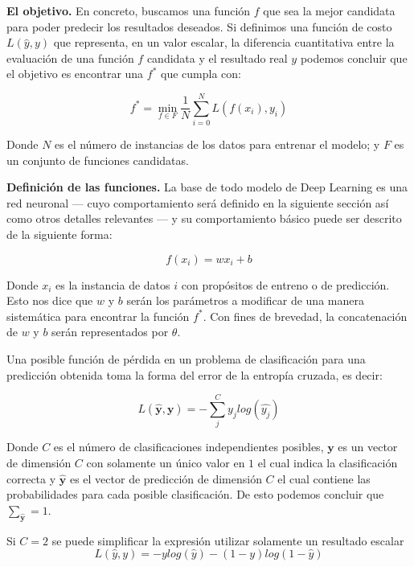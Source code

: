 \textbf{El objetivo.} En concreto, buscamos una función $f$ que sea la mejor candidata para poder predecir los resultados deseados. Si definimos una función de costo $L(\hat{y}, y)$ que representa, en un valor escalar, la diferencia cuantitativa entre la evaluación de una función $f$ candidata y el resultado real $y$ podemos concluir que el objetivo es encontrar una $f^*$ que cumpla con:

\[ f^* = \min_{f \in F} \frac{1}{N} \sum_{i = 0}^{N} L(f(x_i), y_i) \]

Donde $N$ es el número de instancias de los datos para entrenar el modelo; y $F$ es un conjunto de funciones candidatas.

\textbf{Definición de las funciones.} La base de todo modelo de Deep Learning es una red neuronal --- cuyo comportamiento será definido en la siguiente sección así como otros detalles relevantes --- y su comportamiento básico puede ser descrito de la siguiente forma:

\[ f(x_i) = w x_i + b \]

Donde $x_i$ es la instancia de datos $i$ con propósitos de entreno o de predicción. Esto nos dice que $w$ y $b$ serán los parámetros a modificar de una manera sistemática para encontrar la función $f^*$. Con fines de brevedad, la concatenación de $w$ y $b$ serán representados por $\theta$.

Una posible función de pérdida en un problema de clasificación para una predicción obtenida toma la forma del error de la entropía cruzada, es decir:

\begin{equation}
\label{eq:crossentropy}
L(\mathbf{\hat{y}}, \mathbf{y}) = - \sum_{j}^{C} y_j log \left( \hat{y_j} \right)
\end{equation}

Donde $C$ es el número de clasificaciones independientes posibles, $\mathbf{y}$ es un vector de dimensión $C$ con solamente un único valor en $1$ el cual indica la clasificación correcta y $\mathbf{\hat{y}}$ es el vector de predicción de dimensión $C$ el cual contiene las probabilidades para cada posible clasificación. De esto podemos concluir que $\sum_{\mathbf{\hat{y}}} = 1$.

Si $C = 2$ se puede simplificar la expresión utilizar solamente un resultado escalar
\begin{equation}
\label{eq:bincrossentropy}
L(\hat{y}, y) = - y log \left( \hat{y} \right) - \left(1 - y\right) log \left( 1 - \hat{y} \right)
\end{equation}

